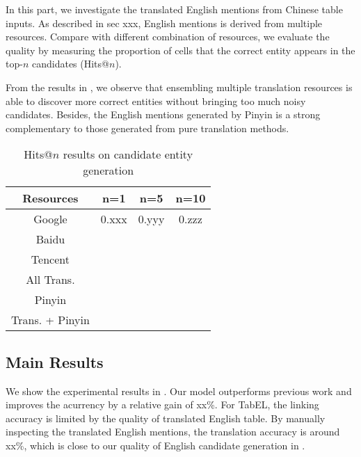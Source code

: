 
In this part, we investigate the translated English mentions from Chinese table inputs.
As described in sec xxx, English mentions is derived from multiple resources.
Compare with different combination of resources, we evaluate the quality by
measuring the proportion of cells that the correct entity appears in the top-$n$ candidates
(Hits@$n$).

From the results in , we observe that
ensembling multiple translation resources is able to discover more correct entities 
without bringing too much noisy candidates.
Besides, the English mentions generated by Pinyin is a strong complementary to
those generated from pure translation methods.

\begin{table}[ht]
    \label{tab:cand-gen-quality}
    \centering
    \caption{Hits@$n$ results on candidate entity generation}
    \begin{tabular} {c|ccc}
        Resources   &   n=1     &   n=5     &   n=10    \\
        \hline
        Google      &   0.xxx   &   0.yyy   &   0.zzz   \\
        Baidu       &   &   &   \\
        Tencent     &   &   &   \\
        All Trans.  &   &   &   \\
        \hline
        Pinyin      &   &   &   \\
        \hline
        Trans. + Pinyin    &   &   &   \\
    \end{tabular}
\end{table}


\subsection{Main Results}

We show the experimental results in .
Our model outperforms previous work and improves the acurrency by a relative gain of xx\%.
For TabEL, the linking accuracy is limited by the quality of translated English table.
By manually inspecting the translated English mentions, the translation accuracy is around xx\%,
which is close to our quality of English candidate generation in .


